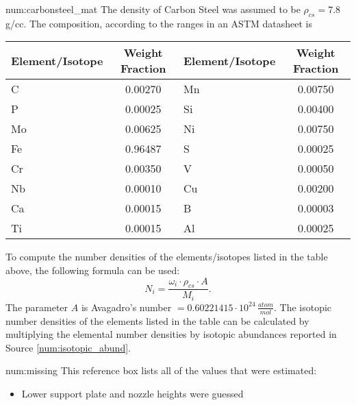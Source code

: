\begin{numitem}{num:carbonsteel_mat}
   The density of Carbon Steel was assumed to be $\rho_{cs} = 7.8$ g/cc.  The composition, according to the ranges in an ASTM datasheet is
 \begin{center}
  \begin{tabular}{l c l c}
    \toprule 
    Element/Isotope & Weight Fraction & Element/Isotope & Weight Fraction \\
    \midrule
    \midrule
C    &  0.00270  &  Mn  &   0.00750  \\
P    &  0.00025  &  Si  &   0.00400  \\
Mo   &  0.00625  &  Ni  &   0.00750  \\
Fe   &  0.96487  &  S   &   0.00025  \\
Cr   &  0.00350  &  V   &   0.00050  \\
Nb   &  0.00010  &  Cu  &   0.00200  \\
Ca   &  0.00015  &  B   &   0.00003  \\
Ti   &  0.00015  &  Al  &   0.00025  \\
    \bottomrule
  \end{tabular}
 \end{center}

To compute the number densities of the elements/isotopes listed in the table above, the following formula can be used:
\[
    N_i = \frac{\omega_i\cdot\rho_{cs}\cdot A}{M_i}.
\]
The parameter $A$ is Avagadro's number $=0.60221415\cdot 10^{24}\,\frac{atom}{mol}$. The isotopic number densities of the elements listed in the table can be calculated by multiplying the elemental number densities by isotopic abundances reported in Source \ref{num:isotopic_abund}.


\end{numitem}

\begin{numitem}{num:missing}
  This reference box lists all of the values that were estimated:
  \begin{itemize}
      \item Lower support plate and nozzle heights were guessed
  \end{itemize}
\end{numitem}

